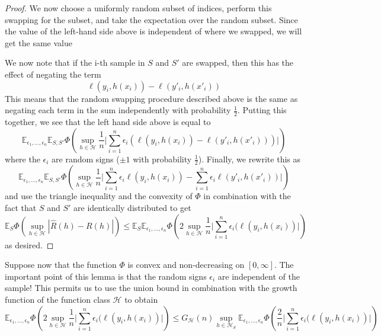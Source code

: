\begin{proof}
	We now choose a uniformly random subset of indices, perform this swapping
	for the subset, and take the expectation over the random subset. Since the value
	of the left-hand side above is independent of where we swapped, we will get the same value
	
	We now note that if the i-th sample in $S$ and $S'$ are swapped, then this
	has the effect of negating the term
	\begin{equation}
	\ell(y_i,h(x_i))-\ell(y'_i,h(x'_i))
	\end{equation}
	This means that the random swapping procedure described above is the same
	as negating each term in the sum independently with probability $\frac{1}{2}$. Putting
	this together, we see that the left hand side above is equal to
	\begin{equation}
	\mathbb{E}_{\epsilon_1,...,\epsilon_n}\mathbb{E}_{S,S'} \Phi\left(\sup_{h \in \mathcal{H}} \frac{1}{n} \bigg| \sum_{i=1}^{n}\epsilon_i (\ell(y_i,h(x_i))-\ell(y'_i,h(x'_i))) \bigg| \right)
	\end{equation}
	where the $\epsilon_i$ are random signs ($\pm1$ with probability $\frac{1}{2}$).
	Finally, we rewrite this as
	\begin{equation}
	\mathbb{E}_{\epsilon_1,...,\epsilon_n}\mathbb{E}_{S,S'} \Phi\left(\sup_{h \in \mathcal{H}} \frac{1}{n} \bigg| \sum_{i=1}^{n}\epsilon_i \ell(y_i,h(x_i))- \sum_{i=1}^{n}\epsilon_i\ell(y'_i,h(x'_i)) \bigg| \right)
	\end{equation}
	and use the triangle inequality and the convexity of $\Phi$ in combination with the
	fact that $S$ and $S'$ are identically distributed to get
	\begin{equation}
	\mathbb{E}_S\Phi\left(\sup_{h \in \mathcal{H}}|\hat{R}(h)-R(h)| \right) \leq \mathbb{E}_{S}\mathbb{E}_{\epsilon_1,...,\epsilon_n} \Phi \left(2\sup_{h \in \mathcal{H}} \frac{1}{n} \bigg| \sum_{i=1}^{n}\epsilon_i (\ell(y_i,h(x_i))\bigg| \right)
	\end{equation}
	as desired.
\end{proof}
Suppose now that the function $\Phi$ is convex and non-decreasing on $[0,\infty]$.
The important point of this lemma is that the random signs $\epsilon_i$ are independent
of the sample! This permits us to use the union bound in combination with the
growth function of the function class $\mathcal{H}$ to obtain
\begin{equation}
\mathbb{E}_{\epsilon_1,...,\epsilon_n} \Phi \left(2\sup_{h \in \mathcal{H}} \frac{1}{n} \bigg| \sum_{i=1}^{n}\epsilon_i (\ell(y_i,h(x_i))\bigg| \right) \leq G_{\mathcal{H}}(n) \sup_{h \in \mathcal{H}_S} \mathbb{E}_{\epsilon_1,...,\epsilon_n} \Phi \left( \frac{2}{n} \bigg| \sum_{i=1}^{n}\epsilon_i (\ell(y_i,h(x_i))\bigg| \right)
\end{equation}
